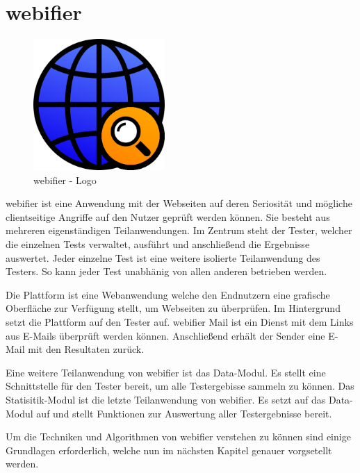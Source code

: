 \section{webifier}

\begin{figure}[H]
  \centering
  \includegraphics[width=5cm]{images/webifier}
  \caption{webifier - Logo}
  \label{fig:webifier-logo}
\end{figure}

webifier ist eine Anwendung mit der Webseiten auf deren Seriosität und mögliche clientseitige Angriffe auf den Nutzer geprüft werden können. Sie besteht aus mehreren eigenständigen Teilanwendungen. Im Zentrum steht der Tester, welcher die einzelnen Tests verwaltet, ausführt und anschließend die Ergebnisse auswertet. Jeder einzelne Test ist eine weitere isolierte Teilanwendung des Testers. So kann jeder Test unabhänig von allen anderen betrieben werden.

Die Plattform ist eine Webanwendung welche den Endnutzern eine grafische Oberfläche zur Verfügung stellt, um Webseiten zu überprüfen. Im Hintergrund setzt die Plattform auf den Tester auf. webifier Mail ist ein Dienst mit dem Links aus E-Mails überprüft werden können. Anschließend erhält der Sender eine E-Mail mit den Resultaten zurück.

Eine weitere Teilanwendung von webifier ist das Data-Modul. Es stellt eine Schnittstelle für den Tester bereit, um alle Testergebisse sammeln zu können. Das Statisitik-Modul ist die letzte Teilanwendung von webifier. Es setzt auf das Data-Modul auf und stellt Funktionen zur Auswertung aller Testergebnisse bereit.

Um die Techniken und Algorithmen von webifier verstehen zu können sind einige Grundlagen erforderlich, welche nun im nächsten Kapitel genauer vorgsetellt werden.
